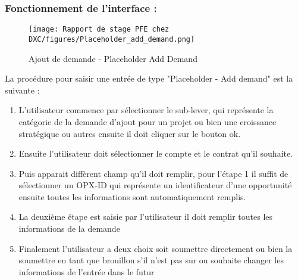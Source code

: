 
\subsubsection{Fonctionnement de l'interface :}

\begin{figure}[H]
    \centering
    \texttt{[image: Rapport de stage PFE chez DXC/figures/Placeholder\_add\_demand.png]}
    \caption{Ajout de demande - Placeholder Add Demand}
\end{figure}

La procédure pour saisir une entrée de type "Placeholder - Add demand" est la suivante :

\begin{enumerate}
    
    \item L'utilisateur commence par sélectionner le sub-lever, qui représente la catégorie de la demande d'ajout pour un projet ou bien une croissance stratégique ou autres ensuite il doit cliquer sur le bouton ok.
    \vspace{0.1cm}
    \item Ensuite l'utilisateur doit sélectionner le compte et le contrat qu'il souhaite.
    \vspace{0.1cm}
    \item Puis apparait diffèrent champ qu'il doit remplir, pour l'étape 1 il suffit de sélectionner un OPX-ID qui représente un identificateur d'une opportunité ensuite toutes les informations sont automatiquement remplis.
    \vspace{0.1cm}
    \item La deuxième étape est saisie par l'utilisateur il doit remplir toutes les informations de la demande
    \vspace{0.1cm}
    \item Finalement l'utilisateur a deux choix soit soumettre directement ou bien la soumettre en tant que brouillon s'il n'est pas sur ou souhaite changer les informations de l'entrée dans le futur

\end{enumerate}


